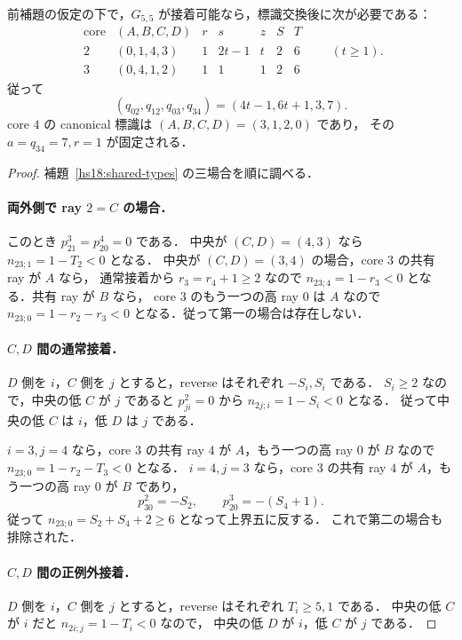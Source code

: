 \begin{lemma}
\label{hs18:node-family}
前補題の仮定の下で，$G_{5,5}$ が接着可能なら，標識交換後に次が必要である：
\[
 \begin{array}{c|c|ccccc}
 \text{core}&(A,B,C,D)&r&s&z&S&T\\\hline
 2&(0,1,4,3)&1&2t-1&t&2&6\\
 3&(0,4,1,2)&1&1&1&2&6
 \end{array}\qquad (t\ge1).
\]
従って
\[
 (q_{02},q_{12},q_{03},q_{34})=(4t-1,6t+1,3,7).
\]
core $4$ の canonical 標識は $(A,B,C,D)=(3,1,2,0)$ であり，
その $a=q_{34}=7,r=1$ が固定される．
\end{lemma}

\begin{proof}
補題~\ref{hs18:shared-types} の三場合を順に調べる．

\paragraph{両外側で ray $2=C$ の場合．}
このとき $p^3_{21}=p^4_{20}=0$ である．
中央が $(C,D)=(4,3)$ なら $n_{23;1}=1-T_2<0$ となる．
中央が $(C,D)=(3,4)$ の場合，core $3$ の共有 ray が $A$ なら，
通常接着から $r_3=r_4+1\ge2$ なので
$n_{23;4}=1-r_3<0$ となる．共有 ray が $B$ なら，
core $3$ のもう一つの高 ray $0$ は $A$ なので
$n_{23;0}=1-r_2-r_3<0$ となる．従って第一の場合は存在しない．

\paragraph{$C,D$ 間の通常接着．}
$D$ 側を $i$，$C$ 側を $j$ とすると，reverse はそれぞれ $-S_i,S_i$ である．
$S_i\ge2$ なので，中央の低 $C$ が $j$ であると
$p^2_{ji}=0$ から $n_{2j;i}=1-S_i<0$ となる．
従って中央の低 $C$ は $i$，低 $D$ は $j$ である．

$i=3,j=4$ なら，core $3$ の共有 ray $4$ が $A$，もう一つの高 ray $0$ が $B$ なので
$n_{23;0}=1-r_2-T_3<0$ となる．
$i=4,j=3$ なら，core $3$ の共有 ray $4$ が $A$，もう一つの高 ray $0$ が $B$ であり，
\[
 p^2_{30}=-S_2,\qquad p^3_{20}=-(S_4+1).
\]
従って
$n_{23;0}=S_2+S_4+2\ge6$ となって上界五に反する．
これで第二の場合も排除された．

\paragraph{$C,D$ 間の正例外接着．}
$D$ 側を $i$，$C$ 側を $j$ とすると，reverse はそれぞれ $T_i\ge5,1$ である．
中央の低 $C$ が $i$ だと $n_{2i;j}=1-T_i<0$ なので，
中央の低 $D$ が $i$，低 $C$ が $j$ である．


\end{proof}
